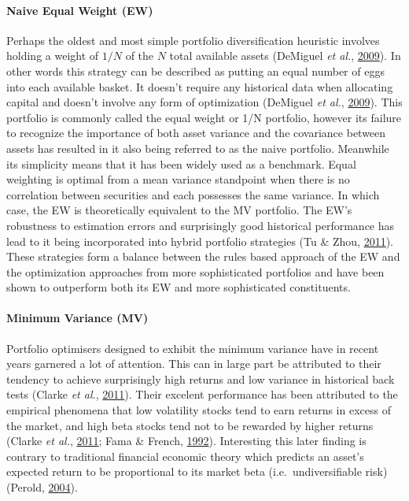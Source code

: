 \documentclass[11pt,preprint, authoryear]{elsarticle}
\numberwithin{equation}{section}
\numberwithin{figure}{section}
\numberwithin{table}{section}
\begin{document}
\hypertarget{naive-equal-weight-ew}{%
\paragraph{Naive Equal Weight (EW)}\label{naive-equal-weight-ew}}

Perhaps the oldest and most simple portfolio diversification heuristic
involves holding a weight of \(1/N\) of the \(N\) total available assets
(DeMiguel \emph{et al.}, \protect\hyperlink{ref-demiguel2009}{2009}). In
other words this strategy can be described as putting an equal number of
eggs into each available basket. It doesn't require any historical data
when allocating capital and doesn't involve any form of optimization
(DeMiguel \emph{et al.}, \protect\hyperlink{ref-demiguel2009}{2009}).
This portfolio is commonly called the equal weight or 1/N portfolio,
however its failure to recognize the importance of both asset variance
and the covariance between assets has resulted in it also being referred
to as the naive portfolio. Meanwhile its simplicity means that it has
been widely used as a benchmark. Equal weighting is optimal from a mean
variance standpoint when there is no correlation between securities and
each possesses the same variance. In which case, the EW is theoretically
equivalent to the MV portfolio. The EW's robustness to estimation errors
and surprisingly good historical performance has lead to it being
incorporated into hybrid portfolio strategies (Tu \& Zhou,
\protect\hyperlink{ref-tu2011}{2011}). These strategies form a balance
between the rules based approach of the EW and the optimization
approaches from more sophisticated portfolios and have been shown to
outperform both its EW and more sophisticated constituents.

\hypertarget{minimum-variance-mv}{%
\paragraph{Minimum Variance (MV)}\label{minimum-variance-mv}}

Portfolio optimisers designed to exhibit the minimum variance have in
recent years garnered a lot of attention. This can in large part be
attributed to their tendency to achieve surprisingly high returns and
low variance in historical back tests (Clarke \emph{et al.},
\protect\hyperlink{ref-clarke2011}{2011}). Their excelent performance
has been attributed to the empirical phenomena that low volatility
stocks tend to earn returns in excess of the market, and high beta
stocks tend not to be rewarded by higher returns (Clarke \emph{et al.},
\protect\hyperlink{ref-clarke2011}{2011}; Fama \& French,
\protect\hyperlink{ref-fama1992}{1992}). Interesting this later finding
is contrary to traditional financial economic theory which predicts an
asset's expected return to be proportional to its market beta
(i.e.~undiversifiable risk) (Perold,
\protect\hyperlink{ref-perold2004}{2004}).
\end{document}

